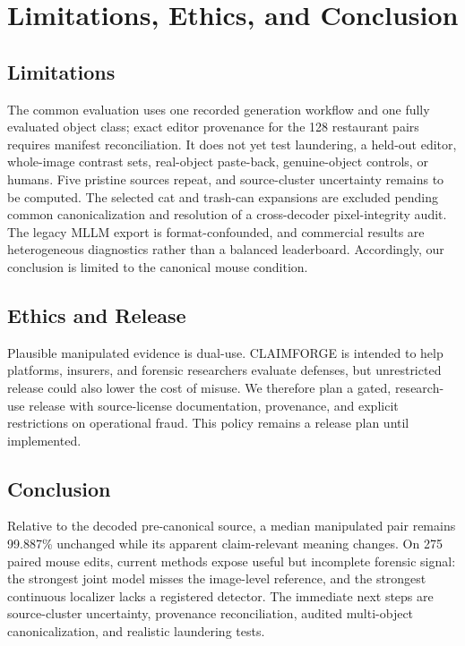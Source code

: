 \section{Limitations, Ethics, and Conclusion}
\label{sec:limitations}

\subsection{Limitations}

The common evaluation uses one recorded generation workflow and one fully evaluated object class; exact editor provenance for the 128 restaurant pairs requires manifest reconciliation. It does not yet test laundering, a held-out editor, whole-image contrast sets, real-object paste-back, genuine-object controls, or humans. Five pristine sources repeat, and source-cluster uncertainty remains to be computed. The selected cat and trash-can expansions are excluded pending common canonicalization and resolution of a cross-decoder pixel-integrity audit. The legacy MLLM export is format-confounded, and commercial results are heterogeneous diagnostics rather than a balanced leaderboard. Accordingly, our conclusion is limited to the canonical mouse condition.

\subsection{Ethics and Release}

Plausible manipulated evidence is dual-use. CLAIMFORGE is intended to help platforms, insurers, and forensic researchers evaluate defenses, but unrestricted release could also lower the cost of misuse. We therefore plan a gated, research-use release with source-license documentation, provenance, and explicit restrictions on operational fraud. This policy remains a release plan until implemented.

\subsection{Conclusion}

Relative to the decoded pre-canonical source, a median manipulated pair remains 99.887\% unchanged while its apparent claim-relevant meaning changes. On 275 paired mouse edits, current methods expose useful but incomplete forensic signal: the strongest joint model misses the image-level reference, and the strongest continuous localizer lacks a registered detector. The immediate next steps are source-cluster uncertainty, provenance reconciliation, audited multi-object canonicalization, and realistic laundering tests.
